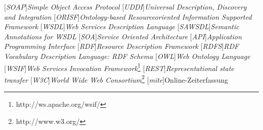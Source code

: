 
[\emph{SOAP}]{\emph{Simple Object Access Protocol}}
[\emph{UDDI}]{\emph{Universal Description, Discovery and Integration}}
[\emph{ORISF}]{\emph{Ontology-based Resourceoriented Information Supported Framework}}
[\emph{WSDL}]{\emph{Web Services Description Language}}
[\emph{SAWSDL}]{\emph{Semantic Annotations for WSDL}}
[\emph{SOA}]{\emph{Service Oriented Architecture}}
[\emph{API}]{\emph{Application Programming Interface}}
[\emph{RDF}]{\emph{Resource Description Framework}}
[\emph{RDFS}]{\emph{RDF Vocabulary Description Language: RDF Schema}}
[\emph{OWL}]{\emph{Web Ontology Language}}
[\emph{WSIF}]{\emph{Web Services Invocation Framework}\footnote{http://ws.apache.org/wsif/}}
[\emph{REST}]{\emph{Representational state transfer}}
[\emph{W3C}]{\emph{World Wide Web Consortium}\footnote{http://www.w3.org/}}
[\emph{mite}]{Online-Zeiterfassung}